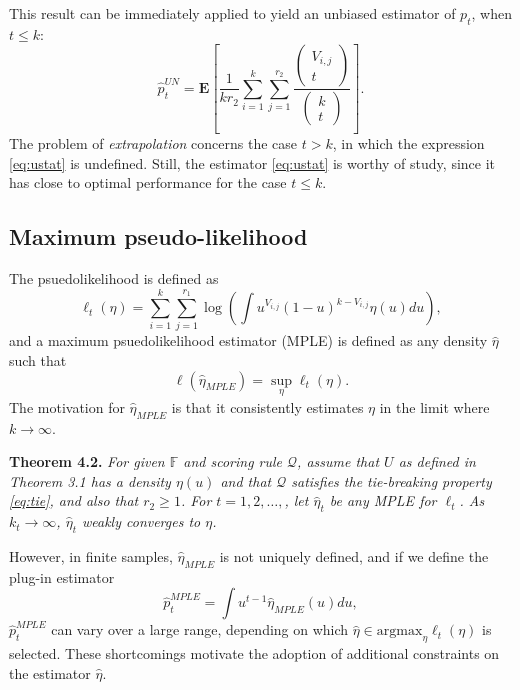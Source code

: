 \documentclass{article}
\newcommand{\E}{\textbf{E}}
\newcommand{\argmax}{\text{argmax}}
\begin{document}
This result can be immediately applied to yield an unbiased estimator of $p_t$, when $t \leq k$:
\begin{equation}\label{eq:ustat}
\hat{p}_t^{UN} = \E\left[ \frac{1}{kr_2}\sum_{i=1}^k\sum_{j=1}^{r_2} \frac{\begin{pmatrix}
V_{i, j} \\ t
\end{pmatrix}}{\begin{pmatrix}
k \\ t
\end{pmatrix}} \right].
\end{equation}
The problem of \emph{extrapolation} concerns the case $t > k$, in
which the expression \eqref{eq:ustat} is undefined.  Still, the
estimator \eqref{eq:ustat} is worthy of study, since it has close to
optimal performance for the case $t \leq k$.

\subsection{Maximum pseudo-likelihood}

The psuedolikelihood is defined as
\begin{equation}\label{eq:psuedo}
\ell_t(\eta) = \sum_{i=1}^k \sum_{j=1}^{r_1} \log\left(\int u^{V_{i, j}} (1-u)^{k - V_{i, j}} \eta(u) du\right),
\end{equation}
and a maximum psuedolikelihood estimator (MPLE) is defined as any
density $\hat{\eta}$ such that
\[
\ell(\hat{\eta}_{MPLE}) = \sup_{\eta} \ell_t(\eta).
\]
The motivation for $\hat{\eta}_{MPLE}$ is that it consistently
estimates $\eta$ in the limit where $k \to \infty$.

\noindent\textbf{Theorem 4.2.}  \emph{ For given $\mathbb{F}$ and scoring
  rule $\mathcal{Q}$, assume that $U$ as defined in Theorem 3.1 has a
  density $\eta(u)$ and that $\mathcal{Q}$ satisfies the tie-breaking
  property \eqref{eq:tie}, and also that $r_2 \geq 1$.  For $t = 1, 2,
  \hdots, $, let $\hat{\eta}_t$ be any MPLE for $\ell_t$.  As $k_t \to
  \infty$, $\hat{\eta}_t$ weakly converges to $\eta$.}

However, in finite samples, $\hat{\eta}_{MPLE}$ is not uniquely defined,
and if we define the plug-in estimator
\[
\hat{p}_t^{MPLE} = \int u^{t-1} \hat{\eta}_{MPLE}(u) du,
\]
$\hat{p}_t^{MPLE}$ can vary over a large range, depending on which $\hat{\eta} \in \argmax_{\eta} \ell_t(\eta)$
is selected.
These shortcomings motivate the adoption of additional constraints on the estimator $\hat{\eta}.$
\end{document}
